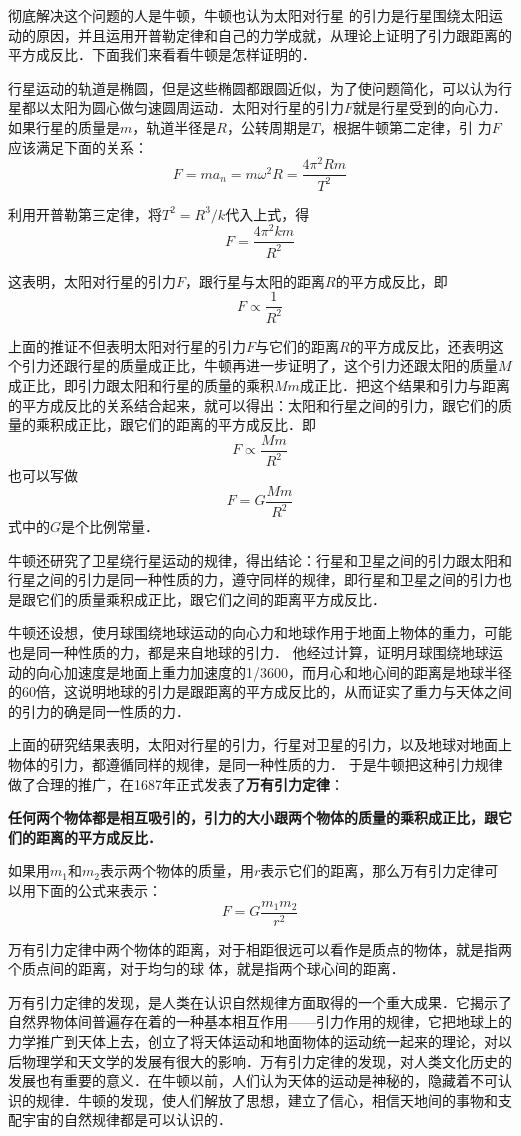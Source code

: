 彻底解决这个问题的人是牛顿，牛顿也认为太阳对行星
的引力是行星围绕太阳运动的原因，并且运用开普勒定律和自己的力学成就，从理论上证明了引力跟距离的平方成反比．下面我们来看看牛顿是怎样证明的．

行星运动的轨道是椭圆，但是这些椭圆都跟圆近似，为了使问题简化，可以认为行星都以太阳为圆心做匀速圆周运动．太阳对行星的引力$F$就是行星受到的向心力．如果行星的质量是$m$，轨道半径是$R$，公转周期是$T$，根据牛顿第二定律，引
力$F$应该满足下面的关系：
\[F=ma_n=m\omega^2 R=\frac{4\pi^2 Rm}{T^2} \]

利用开普勒第三定律，将$T^2=R^3/k$代入上式，得
\[F=\frac{4\pi^2km}{R^2} \]

这表明，太阳对行星的引力$F$，跟行星与太阳的距离$R$的平方成反比，即
\[F\propto \frac{1}{R^2} \]

上面的推证不但表明太阳对行星的引力$F$与它们的距离$R$的平方成反比，还表明这个引力还跟行星的质量成正比，牛顿再进一步证明了，这个引力还跟太阳的质量$M$成正比，即引力跟太阳和行星的质量的乘积$Mm$成正比．把这个结果和引力与距离的平方成反比的关系结合起来，就可以得出：太阳和行星之间的引力，跟它们的质量的乘积成正比，跟它们的距离的平方成反比．即
\[F\propto \frac{Mm}{R^2} \]
也可以写做
\[F=G\frac{Mm}{R^2} \]
式中的$G$是个比例常量．

牛顿还研究了卫星绕行星运动的规律，得出结论：行星和卫星之间的引力跟太阳和行星之间的引力是同一种性质的力，遵守同样的规律，即行星和卫星之间的引力也是跟它们的质量乘积成正比，跟它们之间的距离平方成反比．

牛顿还设想，使月球围绕地球运动的向心力和地球作用于地面上物体的重力，可能也是同一种性质的力，都是来自地球的引力．
他经过计算，证明月球围绕地球运动的向心加速度是地面上重力加速度的1/3600，而月心和地心间的距离是地球半径的60倍，这说明地球的引力是跟距离的平方成反比的，从而证实了重力与天体之间的引力的确是同一性质的力．

上面的研究结果表明，太阳对行星的引力，行星对卫星的引力，以及地球对地面上物体的引力，都遵循同样的规律，是同一种性质的力．
于是牛顿把这种引力规律做了合理的推广，在1687年正式发表了\textbf{万有引力定律}：

\textbf{任何两个物体都是相互吸引的，引力的大小跟两个物体的质量的乘积成正比，跟它们的距离的平方成反比．}

如果用$m_1$和$m_2$表示两个物体的质量，用$r$表示它们的距离，那么万有引力定律可以用下面的公式来表示：
\[ F=G\frac{m_1m_2}{r^2}\]

万有引力定律中两个物体的距离，对于相距很远可以看作是质点的物体，就是指两个质点间的距离，对于均匀的球
体，就是指两个球心间的距离．

万有引力定律的发现，是人类在认识自然规律方面取得的一个重大成果．它揭示了自然界物体间普遍存在着的一种基本相互作用——引力作用的规律，它把地球上的力学推广到天体上去，创立了将天体运动和地面物体的运动统一起来的理论，对以后物理学和天文学的发展有很大的影响．万有引力定律的发现，对人类文化历史的发展也有重要的意义．在牛顿以前，人们认为天体的运动是神秘的，隐藏着不可认识的规律．牛顿的发现，使人们解放了思想，建立了信心，相信天地间的事物和支配宇宙的自然规律都是可以认识的．

